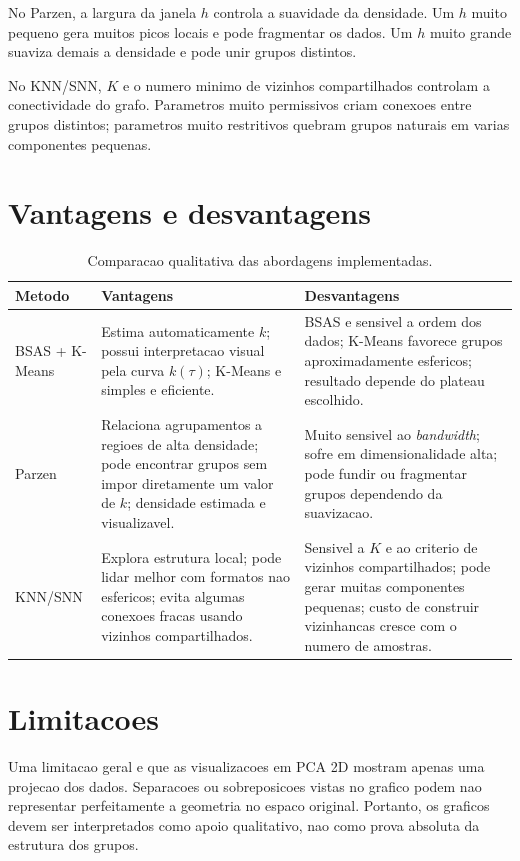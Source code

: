 \documentclass[12pt,a4paper]{article}
\begin{document}
No Parzen, a largura da janela $h$ controla a suavidade da densidade. Um $h$
muito pequeno gera muitos picos locais e pode fragmentar os dados. Um $h$ muito
grande suaviza demais a densidade e pode unir grupos distintos.

No KNN/SNN, $K$ e o numero minimo de vizinhos compartilhados controlam a
conectividade do grafo. Parametros muito permissivos criam conexoes entre grupos
distintos; parametros muito restritivos quebram grupos naturais em varias
componentes pequenas.

\section{Vantagens e desvantagens}

\begin{table}[h]
\centering
\caption{Comparacao qualitativa das abordagens implementadas.}
\label{tab:comparacao}
\begin{tabular}{p{3cm}p{5.4cm}p{5.4cm}}
\toprule
Metodo & Vantagens & Desvantagens \\
\midrule
BSAS + K-Means
& Estima automaticamente $k$; possui interpretacao visual pela curva
$k(\tau)$; K-Means e simples e eficiente.
& BSAS e sensivel a ordem dos dados; K-Means favorece grupos aproximadamente
esfericos; resultado depende do plateau escolhido. \\
\addlinespace
Parzen
& Relaciona agrupamentos a regioes de alta densidade; pode encontrar grupos
sem impor diretamente um valor de $k$; densidade estimada e visualizavel.
& Muito sensivel ao \textit{bandwidth}; sofre em dimensionalidade alta; pode
fundir ou fragmentar grupos dependendo da suavizacao. \\
\addlinespace
KNN/SNN
& Explora estrutura local; pode lidar melhor com formatos nao esfericos; evita
algumas conexoes fracas usando vizinhos compartilhados.
& Sensivel a $K$ e ao criterio de vizinhos compartilhados; pode gerar muitas
componentes pequenas; custo de construir vizinhancas cresce com o numero de
amostras. \\
\bottomrule
\end{tabular}
\end{table}

\section{Limitacoes}

Uma limitacao geral e que as visualizacoes em PCA 2D mostram apenas uma
projecao dos dados. Separacoes ou sobreposicoes vistas no grafico podem nao
representar perfeitamente a geometria no espaco original. Portanto, os graficos
devem ser interpretados como apoio qualitativo, nao como prova absoluta da
estrutura dos grupos.
\end{document}
